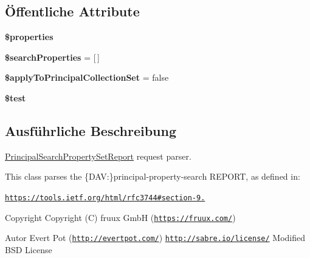 \subsection*{Öffentliche Attribute}
\begin{DoxyCompactItemize}
\item 
\mbox{\label{class_sabre_1_1_d_a_v_a_c_l_1_1_xml_1_1_request_1_1_principal_property_search_report_a416019a6c83efeebabdc988cdcb9fe76}} 
{\bfseries \$properties}
\item 
\mbox{\label{class_sabre_1_1_d_a_v_a_c_l_1_1_xml_1_1_request_1_1_principal_property_search_report_afd58d22e15b36ff367646da42d4b4486}} 
{\bfseries \$search\+Properties} = \mbox{[}$\,$\mbox{]}
\item 
\mbox{\label{class_sabre_1_1_d_a_v_a_c_l_1_1_xml_1_1_request_1_1_principal_property_search_report_a49b5e21f8dadd81e87e09d071cc6566c}} 
{\bfseries \$apply\+To\+Principal\+Collection\+Set} = false
\item 
\mbox{\label{class_sabre_1_1_d_a_v_a_c_l_1_1_xml_1_1_request_1_1_principal_property_search_report_a861e16ae4af4683ed322e2ca9abd3b6b}} 
{\bfseries \$test}
\end{DoxyCompactItemize}


\subsection{Ausführliche Beschreibung}
\mbox{\hyperlink{class_sabre_1_1_d_a_v_a_c_l_1_1_xml_1_1_request_1_1_principal_search_property_set_report}{Principal\+Search\+Property\+Set\+Report}} request parser.

This class parses the \{D\+AV\+:\}principal-\/property-\/search R\+E\+P\+O\+RT, as defined in\+:

\href{https://tools.ietf.org/html/rfc3744#section-9.4}{\tt https\+://tools.\+ietf.\+org/html/rfc3744\#section-\/9.}

\begin{DoxyCopyright}{Copyright}
Copyright (C) fruux GmbH (\href{https://fruux.com/}{\tt https\+://fruux.\+com/}) 
\end{DoxyCopyright}
\begin{DoxyAuthor}{Autor}
Evert Pot (\href{http://evertpot.com/}{\tt http\+://evertpot.\+com/})  \href{http://sabre.io/license/}{\tt http\+://sabre.\+io/license/} Modified B\+SD License 
\end{DoxyAuthor}


